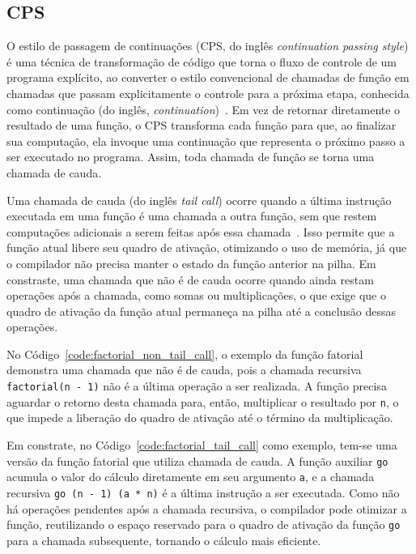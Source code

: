\subsection{CPS}\label{subsec:cps}

O estilo de passagem de continuações (CPS, do inglês \textit{continuation passing style}) é uma técnica de transformação de código que torna o fluxo de controle de um programa explícito, ao converter o estilo convencional de chamadas de função em chamadas que passam explicitamente o controle para a próxima etapa, conhecida como continuação (do inglês, \textit{continuation})~\cite{appel1992compiling}.
Em vez de retornar diretamente o resultado de uma função, o CPS transforma cada função para que, ao finalizar sua computação, ela invoque uma continuação que representa o próximo passo a ser executado no programa.
Assim, toda chamada de função se torna uma chamada de cauda.

Uma chamada de cauda (do inglês \textit{tail call}) ocorre quando a última instrução executada em uma função é uma chamada a outra função, sem que restem computações adicionais a serem feitas após essa chamada~\cite{muchnick1997advanced}.
Isso permite que a função atual libere seu quadro de ativação, otimizando o uso de memória, já que o compilador não precisa manter o estado da função anterior na pilha.
Em constraste, uma chamada que não é de cauda ocorre quando ainda restam operações após a chamada, como somas ou multiplicações, o que exige que o quadro de ativação da função atual permaneça na pilha até a conclusão dessas operações.

No Código~\ref{code:factorial_non_tail_call}, o exemplo da função fatorial demonstra uma chamada que não é de cauda, pois a chamada recursiva \texttt{factorial(n - 1)} não é a última operação a ser realizada.
A função precisa aguardar o retorno desta chamada para, então, multiplicar o resultado por \texttt{n}, o que impede a liberação do quadro de ativação até o término da multiplicação.

Em constrate, no Código~\ref{code:factorial_tail_call} como exemplo, tem-se uma versão da função fatorial que utiliza chamada de cauda.
A função auxiliar \texttt{go} acumula o valor do cálculo diretamente em seu argumento \texttt{a}, e a chamada recursiva \texttt{go (n - 1) (a * n)} é a última instrução a ser executada.
Como não há operações pendentes após a chamada recursiva, o compilador pode otimizar a função, reutilizando o espaço reservado para o quadro de ativação da função \texttt{go} para a chamada subsequente, tornando o cálculo mais eficiente.

